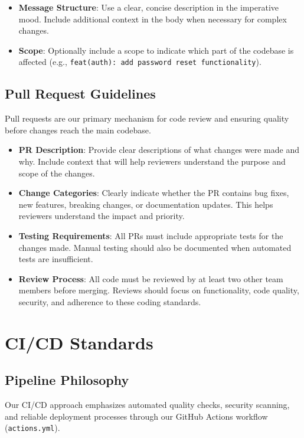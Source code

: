 \documentclass[12pt]{article}
\begin{document}
\begin{itemize}
    \item \textbf{Message Structure}: Use a clear, concise description in the imperative mood. Include additional context in the body when necessary for complex changes.
    
    \item \textbf{Scope}: Optionally include a scope to indicate which part of the codebase is affected (e.g., \texttt{feat(auth): add password reset functionality}).
\end{itemize}

\subsection{Pull Request Guidelines}
Pull requests are our primary mechanism for code review and ensuring quality before changes reach the main codebase.

\begin{itemize}
    \item \textbf{PR Description}: Provide clear descriptions of what changes were made and why. Include context that will help reviewers understand the purpose and scope of the changes.
    
    \item \textbf{Change Categories}: Clearly indicate whether the PR contains bug fixes, new features, breaking changes, or documentation updates. This helps reviewers understand the impact and priority.
    
    \item \textbf{Testing Requirements}: All PRs must include appropriate tests for the changes made. Manual testing should also be documented when automated tests are insufficient.
    
    \item \textbf{Review Process}: All code must be reviewed by at least two other team members before merging. Reviews should focus on functionality, code quality, security, and adherence to these coding standards.
\end{itemize}

\section{CI/CD Standards}

\subsection{Pipeline Philosophy}
Our CI/CD approach emphasizes automated quality checks, security scanning, and reliable deployment processes through our GitHub Actions workflow (\texttt{actions.yml}).
\end{document}
